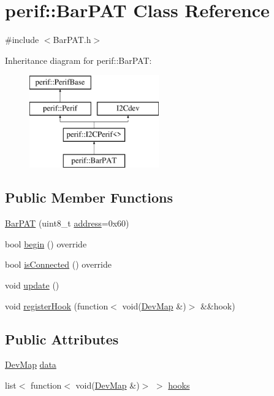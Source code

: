 \hypertarget{classperif_1_1BarPAT}{}\section{perif\+::Bar\+P\+AT Class Reference}
\label{classperif_1_1BarPAT}


{\ttfamily \#include $<$Bar\+P\+A\+T.\+h$>$}

Inheritance diagram for perif\+::Bar\+P\+AT\+:\begin{figure}[H]
\begin{center}
\leavevmode
\includegraphics[height=4.000000cm]{classperif_1_1BarPAT}
\end{center}
\end{figure}
\subsection*{Public Member Functions}
\begin{DoxyCompactItemize}
\item 
\mbox{\hyperlink{classperif_1_1BarPAT_ad927405b022fe8ce7c10b06c743aac10}{Bar\+P\+AT}} (uint8\+\_\+t \mbox{\hyperlink{classperif_1_1I2CPerif_a3275bcc89b3d8ddfa221fb76669c2d45}{address}}=0x60)
\item 
bool \mbox{\hyperlink{classperif_1_1BarPAT_a591d84e84cfd9ec251d1ff8322e23ebb}{begin}} () override
\item 
bool \mbox{\hyperlink{classperif_1_1I2CPerif_aa8741297b2f5f9a0242806afa26b7361}{is\+Connected}} () override
\item 
void \mbox{\hyperlink{classperif_1_1Perif_ad6fe1a13354bba4af4cc2751399ed93c}{update}} ()
\item 
void \mbox{\hyperlink{classperif_1_1PerifBase_a2e8bcc221ee253b21b61c7c07307d931}{register\+Hook}} (function$<$ void(\mbox{\hyperlink{Perif_8hpp_a358ff4ee6d24694ee7661f0cce14377e}{Dev\+Map}} \&)$>$ \&\&hook)
\end{DoxyCompactItemize}
\subsection*{Public Attributes}
\begin{DoxyCompactItemize}
\item 
\mbox{\hyperlink{Perif_8hpp_a358ff4ee6d24694ee7661f0cce14377e}{Dev\+Map}} \mbox{\hyperlink{classperif_1_1PerifBase_a1a3afaa535fda17e9f97123fffe78765}{data}}
\item 
list$<$ function$<$ void(\mbox{\hyperlink{Perif_8hpp_a358ff4ee6d24694ee7661f0cce14377e}{Dev\+Map}} \&)$>$ $>$ \mbox{\hyperlink{classperif_1_1PerifBase_a98964e5ca8384df64881265e0aa6d7b6}{hooks}}
\end{DoxyCompactItemize}
